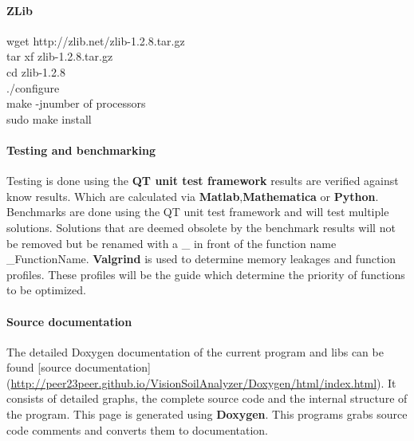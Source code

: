 \paragraph{ZLib}
\begin{sBox}
	wget http://zlib.net/zlib-1.2.8.tar.gz\\
	tar xf zlib-1.2.8.tar.gz\\
	cd zlib-1.2.8\\
	./configure\\
	make -jnumber of processors\\
	sudo make install\\
\end{sBox}

\paragraph{Testing and benchmarking}
Testing is done using the \textbf{QT unit test framework} results are verified against know results. Which are calculated via \textbf{Matlab},\textbf{Mathematica} or \textbf{Python}. Benchmarks are done using the QT unit test framework and will test multiple solutions. Solutions that are deemed obsolete by the benchmark results will not be removed but be renamed with a \_ in front of the function name \_FunctionName. \textbf{Valgrind} is used to determine memory leakages and function profiles. These profiles will be the guide which determine the priority of functions to be optimized.

\paragraph{Source documentation}
The detailed Doxygen documentation of the current program and libs can be found [source documentation](\url{http://peer23peer.github.io/VisionSoilAnalyzer/Doxygen/html/index.html}). It consists of detailed graphs, the complete source code and the internal structure of the program. This page is generated using \textbf{Doxygen}. This programs grabs source code comments and converts them to documentation. 
